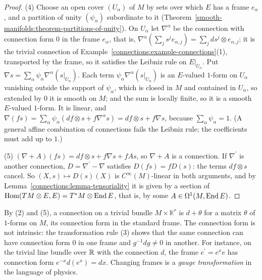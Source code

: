 \begin{proof}
(4) Choose an open cover $(U_\alpha)$ of $M$ by sets over which $E$ has a frame $e_\alpha$, and a partition of unity $(\psi_\alpha)$ subordinate to it
(Theorem~\ref{smooth-manifolds:theorem-partitions-of-unity}). On $U_\alpha$ let $\nabla^\alpha$ be the connection with connection form $0$ in the frame $e_\alpha$, that is,
$\nabla^\alpha(\sum_js^je_{\alpha,j}) = \sum_jds^j \otimes e_{\alpha,j}$; it is the trivial connection of Example~\ref{connections:example-connections}(1), transported by the frame, so it satisfies the
Leibniz rule on $E|_{U_\alpha}$. Put $\nabla s = \sum_\alpha\psi_\alpha\nabla^\alpha(s|_{U_\alpha})$. Each term $\psi_\alpha\nabla^\alpha(s|_{U_\alpha})$ is an $E$-valued $1$-form on $U_\alpha$ vanishing outside the
support of $\psi_\alpha$, which is closed in $M$ and contained in $U_\alpha$, so extended by $0$ it is smooth on $M$; and the sum is locally finite, so it is a smooth $E$-valued $1$-form. It is linear, and
$\nabla(fs) = \sum_\alpha\psi_\alpha(df \otimes s + f\nabla^\alpha s) = df \otimes s + f\nabla s$, because $\sum_\alpha\psi_\alpha = 1$. (A general affine combination of connections
fails the Leibniz rule; the coefficients must add up to $1$.)

(5) $(\nabla + A)(fs) = df \otimes s + f\nabla s + fAs$, so $\nabla + A$ is a connection. If $\nabla^{\prime}$ is another connection, $D = \nabla^{\prime} - \nabla$ satisfies
$D(fs) = fD(s)$: the terms $df \otimes s$ cancel. So $(X, s) \mapsto D(s)(X)$ is $C^\infty(M)$-linear in both arguments, and by Lemma~\ref{connections:lemma-tensoriality} it is given
by a section of $\operatorname{Hom}(TM \otimes E, E) = T^*M \otimes \operatorname{End} E$, that is, by some $A \in \Omega^1(M, \operatorname{End} E)$.
\end{proof}

By (2) and (5), a connection on a trivial bundle $M \times \mathbb{K}^r$ is $d + \theta$ for a matrix $\theta$ of $1$-forms on $M$, its connection form in the standard frame.
The connection form is not intrinsic: the transformation rule (3) shows that the same connection can have connection form $0$ in one frame and $g^{-1}dg \neq 0$ in another. For
instance, on the trivial line bundle over $\mathbb{R}$ with the connection $d$, the frame $e^{\prime} = e^xe$ has connection form $e^{-x}d(e^x) = dx$. Changing frames is a \emph{gauge
transformation} in the language of physics.

